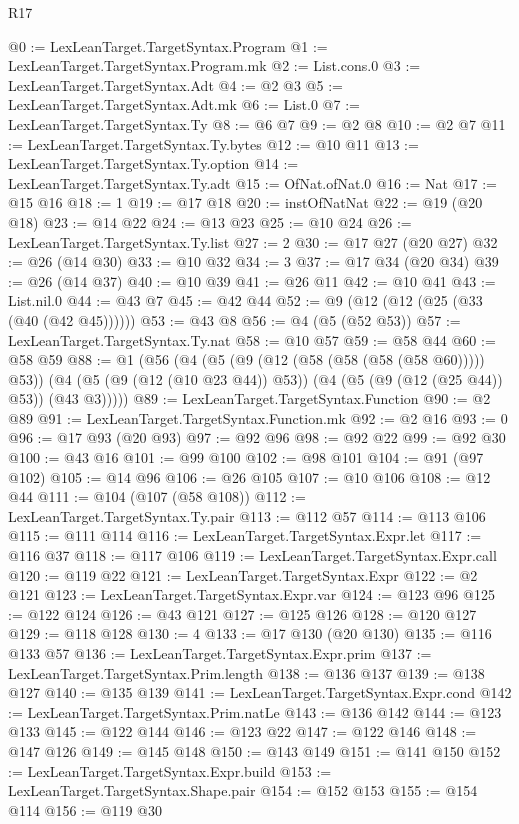\begin{lexlean}{R17}
\begin{coremodule}
@0 := LexLeanTarget.TargetSyntax.Program
@1 := LexLeanTarget.TargetSyntax.Program.mk
@2 := List.cons.{0}
@3 := LexLeanTarget.TargetSyntax.Adt
@4 := @2 @3
@5 := LexLeanTarget.TargetSyntax.Adt.mk
@6 := List.{0}
@7 := LexLeanTarget.TargetSyntax.Ty
@8 := @6 @7
@9 := @2 @8
@10 := @2 @7
@11 := LexLeanTarget.TargetSyntax.Ty.bytes
@12 := @10 @11
@13 := LexLeanTarget.TargetSyntax.Ty.option
@14 := LexLeanTarget.TargetSyntax.Ty.adt
@15 := OfNat.ofNat.{0}
@16 := Nat
@17 := @15 @16
@18 := 1
@19 := @17 @18
@20 := instOfNatNat
@22 := @19 (@20 @18)
@23 := @14 @22
@24 := @13 @23
@25 := @10 @24
@26 := LexLeanTarget.TargetSyntax.Ty.list
@27 := 2
@30 := @17 @27 (@20 @27)
@32 := @26 (@14 @30)
@33 := @10 @32
@34 := 3
@37 := @17 @34 (@20 @34)
@39 := @26 (@14 @37)
@40 := @10 @39
@41 := @26 @11
@42 := @10 @41
@43 := List.nil.{0}
@44 := @43 @7
@45 := @42 @44
@52 := @9 (@12 (@12 (@25 (@33 (@40 (@42 @45))))))
@53 := @43 @8
@56 := @4 (@5 (@52 @53))
@57 := LexLeanTarget.TargetSyntax.Ty.nat
@58 := @10 @57
@59 := @58 @44
@60 := @58 @59
@88 := @1
    (@56
      (@4
        (@5 (@9 (@12 (@58 (@58 (@58 (@58 @60))))) @53))
        (@4 (@5 (@9 (@12 (@10 @23 @44)) @53)) (@4 (@5 (@9 (@12 (@25 @44)) @53)) (@43 @3)))))
@89 := LexLeanTarget.TargetSyntax.Function
@90 := @2 @89
@91 := LexLeanTarget.TargetSyntax.Function.mk
@92 := @2 @16
@93 := 0
@96 := @17 @93 (@20 @93)
@97 := @92 @96
@98 := @92 @22
@99 := @92 @30
@100 := @43 @16
@101 := @99 @100
@102 := @98 @101
@104 := @91 (@97 @102)
@105 := @14 @96
@106 := @26 @105
@107 := @10 @106
@108 := @12 @44
@111 := @104 (@107 (@58 @108))
@112 := LexLeanTarget.TargetSyntax.Ty.pair
@113 := @112 @57
@114 := @113 @106
@115 := @111 @114
@116 := LexLeanTarget.TargetSyntax.Expr.let
@117 := @116 @37
@118 := @117 @106
@119 := LexLeanTarget.TargetSyntax.Expr.call
@120 := @119 @22
@121 := LexLeanTarget.TargetSyntax.Expr
@122 := @2 @121
@123 := LexLeanTarget.TargetSyntax.Expr.var
@124 := @123 @96
@125 := @122 @124
@126 := @43 @121
@127 := @125 @126
@128 := @120 @127
@129 := @118 @128
@130 := 4
@133 := @17 @130 (@20 @130)
@135 := @116 @133 @57
@136 := LexLeanTarget.TargetSyntax.Expr.prim
@137 := LexLeanTarget.TargetSyntax.Prim.length
@138 := @136 @137
@139 := @138 @127
@140 := @135 @139
@141 := LexLeanTarget.TargetSyntax.Expr.cond
@142 := LexLeanTarget.TargetSyntax.Prim.natLe
@143 := @136 @142
@144 := @123 @133
@145 := @122 @144
@146 := @123 @22
@147 := @122 @146
@148 := @147 @126
@149 := @145 @148
@150 := @143 @149
@151 := @141 @150
@152 := LexLeanTarget.TargetSyntax.Expr.build
@153 := LexLeanTarget.TargetSyntax.Shape.pair
@154 := @152 @153
@155 := @154 @114
@156 := @119 @30

\end{coremodule}
\end{lexlean}
